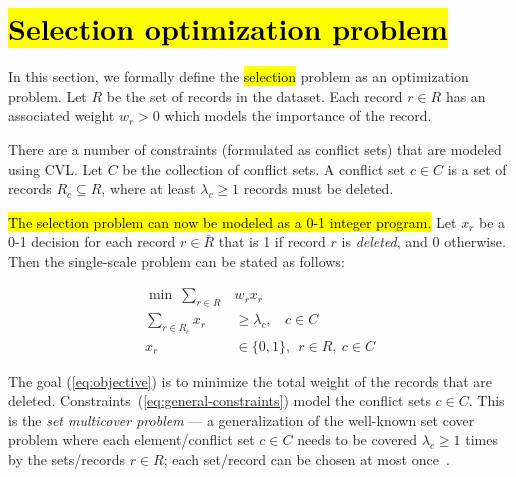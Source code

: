 \section{\hl{Selection optimization problem}}
\label{sec:optimizationmodel}

In this section, we formally define the \hl{selection} problem as an optimization problem. Let $R$ be the set of records in the dataset. Each record $r \in R$ has an associated weight $w_r > 0$ which models the importance of the record. 

There are a number of constraints (formulated as conflict sets) that are modeled using CVL. Let $C$ be the collection of conflict sets. A conflict set $c \in C$ is a set of records $R_c \subseteq R$, where at least $\lambda_c \geq 1$ records must be deleted. 

\hl{The selection problem can now be modeled as a 0-1 integer program.} Let $x_r$ be a 0-1 decision for each record $r \in \bar{R}$ that is 1 if record $r$ is \emph{deleted}, and 0 otherwise. Then the single-scale problem can be stated as follows:

\begin{align}
  \label{eq:objective}
  \min ~\sum_{r \in R} &w_r x_r \\
  \label{eq:general-constraints}
  \sum_{r \in R_c} x_r &\geq \lambda_c, ~~~~ c \in C \\
  x_r & \in \{0, 1\}, ~~ r \in R, ~c \in C
\end{align}

The goal (\ref{eq:objective}) is to minimize the total weight of the records that are deleted. Constraints~(\ref{eq:general-constraints}) model the conflict sets $c \in C$. This is the \emph{set multicover problem} --- a generalization of the well-known set cover problem where each element/conflict set $c \in C$ needs to be covered $\lambda_c \geq 1$ times by the sets/records $r \in R$; each set/record can be chosen at most once~\cite{rajagopalan1998primal}.

